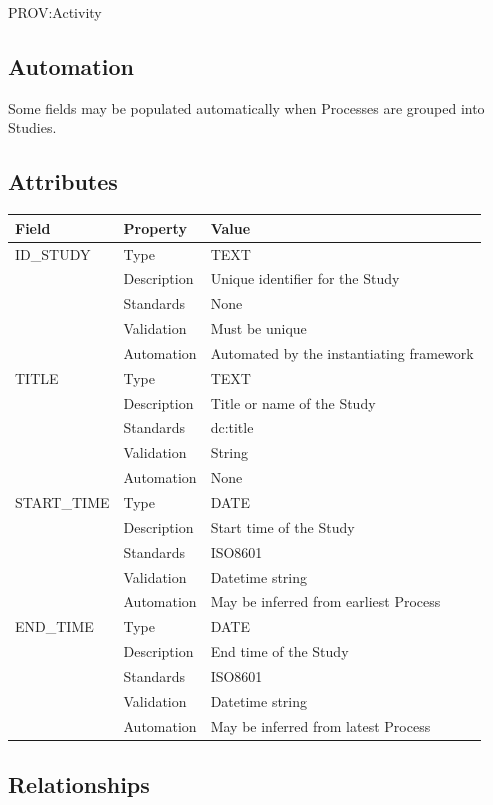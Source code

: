 PROV:Activity

\subsection{Automation}\label{automation-34}

Some fields may be populated automatically when Processes are grouped
into Studies.

\subsection{Attributes}\label{attributes-29}

\begin{longtable}[]{@{}lll@{}}
\toprule\noalign{}
Field & Property & Value \\
\midrule\noalign{}
\endhead
\bottomrule\noalign{}
\endlastfoot
ID\_STUDY & Type & TEXT \\
& Description & Unique identifier for the Study \\
& Standards & None \\
& Validation & Must be unique \\
& Automation & Automated by the instantiating framework \\
TITLE & Type & TEXT \\
& Description & Title or name of the Study \\
& Standards & dc:title \\
& Validation & String \\
& Automation & None \\
START\_TIME & Type & DATE \\
& Description & Start time of the Study \\
& Standards & ISO8601 \\
& Validation & Datetime string \\
& Automation & May be inferred from earliest Process \\
END\_TIME & Type & DATE \\
& Description & End time of the Study \\
& Standards & ISO8601 \\
& Validation & Datetime string \\
& Automation & May be inferred from latest Process \\
\end{longtable}

\subsection{Relationships}\label{relationships-28}

